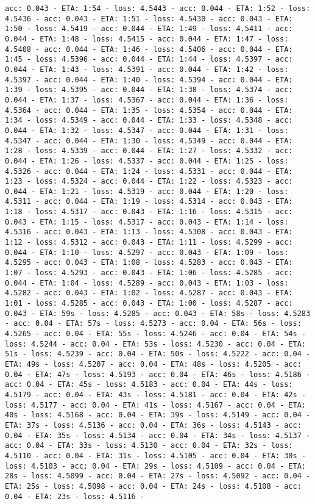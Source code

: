\documentclass[11pt]{article}
\begin{document}
\begin{Verbatim}[commandchars=\\\{\}]
acc: 0.043 - ETA: 1:54 - loss: 4.5443 - acc: 0.044 - ETA: 1:52 - loss: 4.5436 - acc: 0.043 - ETA: 1:51 - loss: 4.5430 - acc: 0.043 - ETA: 1:50 - loss: 4.5419 - acc: 0.044 - ETA: 1:49 - loss: 4.5411 - acc: 0.044 - ETA: 1:48 - loss: 4.5415 - acc: 0.044 - ETA: 1:47 - loss: 4.5408 - acc: 0.044 - ETA: 1:46 - loss: 4.5406 - acc: 0.044 - ETA: 1:45 - loss: 4.5396 - acc: 0.044 - ETA: 1:44 - loss: 4.5397 - acc: 0.044 - ETA: 1:43 - loss: 4.5391 - acc: 0.044 - ETA: 1:42 - loss: 4.5397 - acc: 0.044 - ETA: 1:40 - loss: 4.5394 - acc: 0.044 - ETA: 1:39 - loss: 4.5395 - acc: 0.044 - ETA: 1:38 - loss: 4.5374 - acc: 0.044 - ETA: 1:37 - loss: 4.5367 - acc: 0.044 - ETA: 1:36 - loss: 4.5364 - acc: 0.044 - ETA: 1:35 - loss: 4.5354 - acc: 0.044 - ETA: 1:34 - loss: 4.5349 - acc: 0.044 - ETA: 1:33 - loss: 4.5348 - acc: 0.044 - ETA: 1:32 - loss: 4.5347 - acc: 0.044 - ETA: 1:31 - loss: 4.5347 - acc: 0.044 - ETA: 1:30 - loss: 4.5349 - acc: 0.044 - ETA: 1:28 - loss: 4.5339 - acc: 0.044 - ETA: 1:27 - loss: 4.5332 - acc: 0.044 - ETA: 1:26 - loss: 4.5337 - acc: 0.044 - ETA: 1:25 - loss: 4.5326 - acc: 0.044 - ETA: 1:24 - loss: 4.5331 - acc: 0.044 - ETA: 1:23 - loss: 4.5324 - acc: 0.044 - ETA: 1:22 - loss: 4.5323 - acc: 0.044 - ETA: 1:21 - loss: 4.5319 - acc: 0.044 - ETA: 1:20 - loss: 4.5311 - acc: 0.044 - ETA: 1:19 - loss: 4.5314 - acc: 0.043 - ETA: 1:18 - loss: 4.5317 - acc: 0.043 - ETA: 1:16 - loss: 4.5315 - acc: 0.043 - ETA: 1:15 - loss: 4.5317 - acc: 0.043 - ETA: 1:14 - loss: 4.5316 - acc: 0.043 - ETA: 1:13 - loss: 4.5308 - acc: 0.043 - ETA: 1:12 - loss: 4.5312 - acc: 0.043 - ETA: 1:11 - loss: 4.5299 - acc: 0.044 - ETA: 1:10 - loss: 4.5297 - acc: 0.043 - ETA: 1:09 - loss: 4.5295 - acc: 0.043 - ETA: 1:08 - loss: 4.5283 - acc: 0.043 - ETA: 1:07 - loss: 4.5293 - acc: 0.043 - ETA: 1:06 - loss: 4.5285 - acc: 0.044 - ETA: 1:04 - loss: 4.5289 - acc: 0.043 - ETA: 1:03 - loss: 4.5282 - acc: 0.043 - ETA: 1:02 - loss: 4.5287 - acc: 0.043 - ETA: 1:01 - loss: 4.5285 - acc: 0.043 - ETA: 1:00 - loss: 4.5287 - acc: 0.043 - ETA: 59s - loss: 4.5285 - acc: 0.043 - ETA: 58s - loss: 4.5283 - acc: 0.04 - ETA: 57s - loss: 4.5273 - acc: 0.04 - ETA: 56s - loss: 4.5265 - acc: 0.04 - ETA: 55s - loss: 4.5246 - acc: 0.04 - ETA: 54s - loss: 4.5244 - acc: 0.04 - ETA: 53s - loss: 4.5230 - acc: 0.04 - ETA: 51s - loss: 4.5239 - acc: 0.04 - ETA: 50s - loss: 4.5222 - acc: 0.04 - ETA: 49s - loss: 4.5207 - acc: 0.04 - ETA: 48s - loss: 4.5205 - acc: 0.04 - ETA: 47s - loss: 4.5193 - acc: 0.04 - ETA: 46s - loss: 4.5186 - acc: 0.04 - ETA: 45s - loss: 4.5183 - acc: 0.04 - ETA: 44s - loss: 4.5179 - acc: 0.04 - ETA: 43s - loss: 4.5181 - acc: 0.04 - ETA: 42s - loss: 4.5177 - acc: 0.04 - ETA: 41s - loss: 4.5167 - acc: 0.04 - ETA: 40s - loss: 4.5168 - acc: 0.04 - ETA: 39s - loss: 4.5149 - acc: 0.04 - ETA: 37s - loss: 4.5136 - acc: 0.04 - ETA: 36s - loss: 4.5143 - acc: 0.04 - ETA: 35s - loss: 4.5134 - acc: 0.04 - ETA: 34s - loss: 4.5137 - acc: 0.04 - ETA: 33s - loss: 4.5130 - acc: 0.04 - ETA: 32s - loss: 4.5110 - acc: 0.04 - ETA: 31s - loss: 4.5105 - acc: 0.04 - ETA: 30s - loss: 4.5103 - acc: 0.04 - ETA: 29s - loss: 4.5109 - acc: 0.04 - ETA: 28s - loss: 4.5099 - acc: 0.04 - ETA: 27s - loss: 4.5092 - acc: 0.04 - ETA: 25s - loss: 4.5098 - acc: 0.04 - ETA: 24s - loss: 4.5108 - acc: 0.04 - ETA: 23s - loss: 4.5116 - 
\end{Verbatim}
\end{document}
